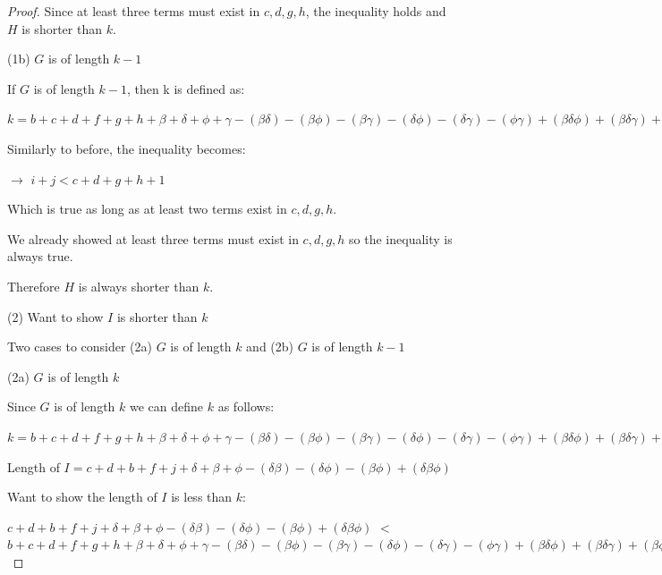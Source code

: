 \documentclass[manuscript]{acmart}
\begin{document}
\begin{proof}
        Since at least three terms must exist in {$c, d, g, h$}, the
        inequality holds and $H$ is shorter than $k$.

        (1b) $G$ is of length $k - 1$

        If $G$ is of length $k - 1$, then k is defined as:

        $k = b + c + d + f + g + h
            + \beta + \delta + \phi + \gamma
            - (\beta \delta) - (\beta \phi) - (\beta \gamma) - (\delta \phi) - (\delta \gamma) -(\phi \gamma)
            + (\beta \delta \phi) + (\beta \delta \gamma) + (\beta \phi \gamma) + (\delta \phi \gamma)
            - (\beta \delta \phi \gamma)
            + 1
        $

        Similarly to before, the inequality becomes:

        $\rightarrow$ $i + j < c + d + g + h + 1$

        Which is true as long as at least two terms exist in {$c, d, g, h$}.

        We already showed at least three terms must exist in {$c, d, g, h$}
        so the inequality is always true.

        Therefore $H$ is always shorter than $k$. 

        (2) Want to show $I$ is shorter than $k$

        Two cases to consider (2a) $G$ is of length $k$ and (2b) $G$ is of length $k - 1$

        (2a) $G$ is of length $k$

        Since $G$ is of length $k$ we can define $k$ as follows:

        $k = b + c + d + f + g + h
            + \beta + \delta + \phi + \gamma
            - (\beta \delta) - (\beta \phi) - (\beta \gamma) - (\delta \phi) - (\delta \gamma) -(\phi \gamma)
            + (\beta \delta \phi) + (\beta \delta \gamma) + (\beta \phi \gamma) + (\delta \phi \gamma)
            - (\beta \delta \phi \gamma)
        $

        Length of $I = c + d + b + f + j
        + \delta + \beta + \phi
        - (\delta \beta) - (\delta \phi) - (\beta \phi)
        + (\delta \beta \phi)
        $

        Want to show the length of $I$ is less than $k$:

        $c + d + b + f + j
        + \delta + \beta + \phi
        - (\delta \beta) - (\delta \phi) - (\beta \phi)
        + (\delta \beta \phi)
        $
        $<$
        $b + c + d + f + g + h
            + \beta + \delta + \phi + \gamma
            - (\beta \delta) - (\beta \phi) - (\beta \gamma) - (\delta \phi) - (\delta \gamma) -(\phi \gamma)
            + (\beta \delta \phi) + (\beta \delta \gamma) + (\beta \phi \gamma) + (\delta \phi \gamma)
            - (\beta \delta \phi \gamma)
        $


\end{proof}
\end{document}
